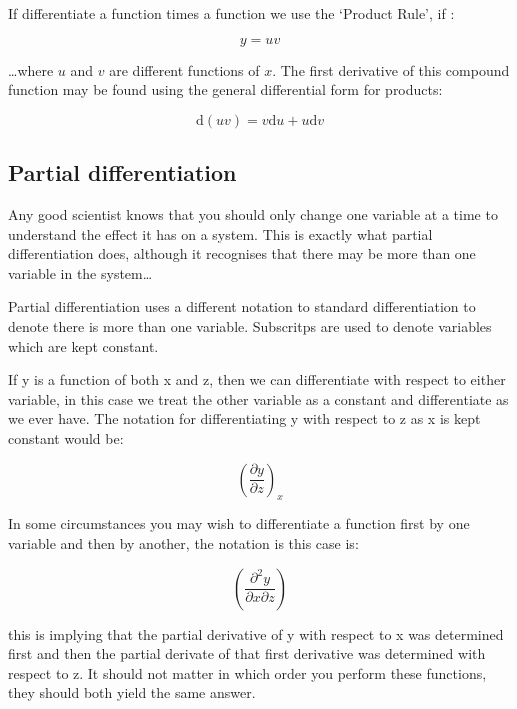 \documentclass[
]{book}
\begin{document}
If differentiate a function times a function we use the `Product Rule', if :

\begin{equation*}
y= uv
\end{equation*}

\ldots where \(u\) and \(v\) are different functions of \(x\). The first derivative of this compound function may be found using the general differential form for products:

\begin{equation}
\textrm{d}(uv) = v\textrm{d}u + u\textrm{d}v
\label{eq:productrule}
\end{equation}

\hypertarget{subsec:partial}{%
\subsection{Partial differentiation}\label{subsec:partial}}

Any good scientist knows that you should only change one variable at a time to understand the effect it has on a system. This is exactly what partial differentiation does, although it recognises that there may be more than one variable in the system\ldots{}

Partial differentiation uses a different notation to standard differentiation to denote there is more than one variable. Subscritps are used to denote variables which are kept constant.

If y is a function of both x and z, then we can differentiate with respect to either variable, in this case we treat the other variable as a constant and differentiate as we ever have. The notation for differentiating y with respect to z as x is kept constant would be:

\begin{equation*}
\left(\frac{\partial y}{\partial z}\right)_x
\end{equation*}

In some circumstances you may wish to differentiate a function first by one variable and then by another, the notation is this case is:

\begin{equation*}
\left(\frac{\partial^2 y}{\partial x \partial z}\right)
\end{equation*}

this is implying that the partial derivative of y with respect to x was determined first and then the partial derivate of that first derivative was determined with respect to z. It should not matter in which order you perform these functions, they should both yield the same answer.
\end{document}
